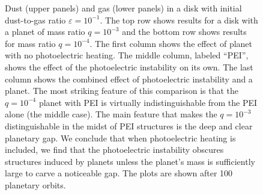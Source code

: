 \documentclass[onecolumn]{report}
\begin{document}
\begin{figure}
  \begin{center}
  \end{center}
  \caption{Dust (upper panels) and gas (lower panels) in
    a disk with initial dust-to-gas ratio $\varepsilon=10^{-1}$. The top row shows results for a disk with a planet of mass ratio $q=10^{-3}$ and the bottom row shows results for mass ratio $q=10^{-4}$. The first column shows the effect of planet with no photoelectric heating. The middle column, labeled ``PEI'', shows the effect of the photoelectric instability on its own. The last column shows the combined effect of photoelectric instability and a planet. The most striking feature of this comparison is that the $q=10^{-4}$ planet with PEI is virtually indistinguishable from the PEI alone (the middle case). The main feature that makes the $q=10^{-3}$ distinguishable in the midst of PEI structures is the deep and clear planetary gap. We conclude that when photoelectric heating is included, we find that the photoelectric instability obscures structures induced by planets unless the planet's mass is sufficiently large to carve a noticeable gap. The plots are shown after 100 planetary orbits.}
  \label{fig:eps01dustgas}
\end{figure}
\end{document}

